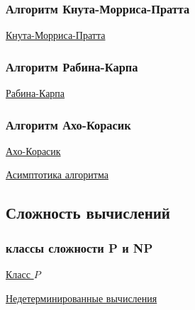 \documentclass{article}
\begin{document}
\subsubsection{Алгоритм Кнута-Морриса-Пратта}

\href{https://neerc.ifmo.ru/wiki/index.php?title=%D0%90%D0%BB%D0%B3%D0%BE%D1%80%D0%B8%D1%82%D0%BC_%D0%9A%D0%BD%D1%83%D1%82%D0%B0-%D0%9C%D0%BE%D1%80%D1%80%D0%B8%D1%81%D0%B0-%D0%9F%D1%80%D0%B0%D1%82%D1%82%D0%B0}{Кнута-Морриса-Пратта}

\subsubsection{Алгоритм Рабина-Карпа}

\href{https://neerc.ifmo.ru/wiki/index.php?title=%D0%9F%D0%BE%D0%B8%D1%81%D0%BA_%D0%BF%D0%BE%D0%B4%D1%81%D1%82%D1%80%D0%BE%D0%BA%D0%B8_%D0%B2_%D1%81%D1%82%D1%80%D0%BE%D0%BA%D0%B5_%D1%81_%D0%B8%D1%81%D0%BF%D0%BE%D0%BB%D1%8C%D0%B7%D0%BE%D0%B2%D0%B0%D0%BD%D0%B8%D0%B5%D0%BC_%D1%85%D0%B5%D1%88%D0%B8%D1%80%D0%BE%D0%B2%D0%B0%D0%BD%D0%B8%D1%8F._%D0%90%D0%BB%D0%B3%D0%BE%D1%80%D0%B8%D1%82%D0%BC_%D0%A0%D0%B0%D0%B1%D0%B8%D0%BD%D0%B0-%D0%9A%D0%B0%D1%80%D0%BF%D0%B0}{Рабина-Карпа}

\subsubsection{Алгоритм Ахо-Корасик}

\href{https://neerc.ifmo.ru/wiki/index.php?title=%D0%90%D0%BB%D0%B3%D0%BE%D1%80%D0%B8%D1%82%D0%BC_%D0%90%D1%85%D0%BE-%D0%9A%D0%BE%D1%80%D0%B0%D1%81%D0%B8%D0%BA}{Ахо-Корасик}

\href{https://ru.wikipedia.org/wiki/%D0%90%D0%BB%D0%B3%D0%BE%D1%80%D0%B8%D1%82%D0%BC_%D0%90%D1%85%D0%BE_%E2%80%94_%D0%9A%D0%BE%D1%80%D0%B0%D1%81%D0%B8%D0%BA}{Асимптотика алгоритма}

\subsection{Сложность вычислений}

\subsubsection{ классы сложности P и NP}

\href{https://neerc.ifmo.ru/wiki/index.php?title=%D0%9A%D0%BB%D0%B0%D1%81%D1%81_P}{Класс $P$}

\href{https://neerc.ifmo.ru/wiki/index.php?title=%D0%9D%D0%B5%D0%B4%D0%B5%D1%82%D0%B5%D1%80%D0%BC%D0%B8%D0%BD%D0%B8%D1%80%D0%BE%D0%B2%D0%B0%D0%BD%D0%BD%D1%8B%D0%B5_%D0%B2%D1%8B%D1%87%D0%B8%D1%81%D0%BB%D0%B5%D0%BD%D0%B8%D1%8F}{Недетерминированные вычисления}
\end{document}
